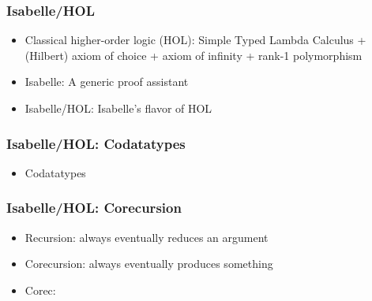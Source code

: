 \documentclass[aspectratio=169,10pt]{beamer}
\begin{document}
\begin{frame}[fragile]
  \frametitle{Isabelle/HOL}
  \begin{itemize}
    \item Classical higher-order logic (HOL): Simple Typed Lambda Calculus + (Hilbert) axiom of choice + axiom of infinity + rank-1 polymorphism
          \pause
    \item Isabelle: A generic proof assistant
          \begin{overlayarea}{\textwidth}{.45\textheight}
            \centering
            \begin{figure}
              \centering
            \end{figure}
          \end{overlayarea}
    \item Isabelle/HOL: Isabelle's flavor of HOL
  \end{itemize}
\end{frame}

\begin{frame}[fragile]
  \frametitle{Isabelle/HOL: Codatatypes}
  \begin{itemize}
    \item Codatatypes
          \vspace*{-1ex}
  \end{itemize}
\end{frame}

\begin{frame}[fragile]
  \frametitle{Isabelle/HOL: Corecursion}
  \begin{itemize}
    \item Recursion: always eventually reduces an argument
    \item Corecursion: always eventually produces something
          \pause
    \item Corec:
  \end{itemize}
\end{frame}
\end{document}
